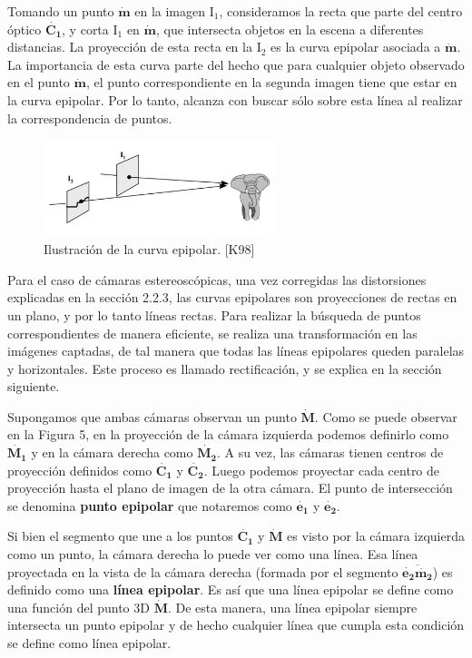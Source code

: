 \documentclass[11pt,a4paper,titlepage]{article}
\newcommand{\TwoCart}[1]{\ensuremath{\mathbf{\dot{#1}}}}
\newcommand{\ThreeCart}[1]{\ensuremath{\mathbf{\dot{#1}}}}
\newcommand{\Plane}[1]{\ensuremath{\mathrm{#1}}}
\newcommand{\Figure}[1]{Figura #1}
\newcommand{\Section}[1]{#1}
\begin{document}
Tomando un punto \TwoCart{m} en la imagen \Plane{I_1}, consideramos la recta que parte del centro óptico \ThreeCart{C_1}, y corta \Plane{I_1} en \TwoCart{m}, que intersecta objetos en la escena a diferentes distancias. La proyección de esta recta en la \Plane{I_2} es la curva epipolar asociada a \TwoCart{m}. La importancia de esta curva parte del hecho que para cualquier objeto observado en el punto \TwoCart{m}, el punto correspondiente en la segunda imagen tiene que estar en la curva epipolar. Por lo tanto, alcanza con buscar sólo sobre esta línea al realizar la correspondencia de puntos.


\begin{figure}[h!]

  \centering
    \includegraphics[width=0.6\textwidth]{f4.png}
  \caption{Ilustración de la curva epipolar. [K98]}
\end{figure}

Para el caso de cámaras estereoscópicas, una vez corregidas las distorsiones explicadas en la sección \Section{2.2.3}, las curvas epipolares son proyecciones de rectas en un plano, y por lo tanto líneas rectas. Para realizar la búsqueda de puntos correspondientes de manera eficiente, se realiza una transformación en las imágenes captadas, de tal manera que todas las líneas epipolares queden paralelas y horizontales. Este proceso es llamado rectificación, y se explica en la sección siguiente.

Supongamos que ambas cámaras observan un punto \ThreeCart{M}. Como se puede observar en la \Figure{5}, en la proyección de la cámara izquierda podemos definirlo como \ThreeCart{M_1} y en la cámara derecha como \ThreeCart{M_2}. A su vez, las cámaras tienen centros de proyección definidos como \ThreeCart{C_1}  y \ThreeCart{C_2}. Luego podemos proyectar cada centro de proyección hasta el plano de imagen de la otra cámara. El punto de intersección se denomina \textbf{punto epipolar} que notaremos como \TwoCart{e_1} y \TwoCart{e_2}.

Si bien el segmento que une a los puntos \ThreeCart{C_1} y \ThreeCart{M} es visto por la cámara izquierda como un punto, la cámara derecha lo puede ver como una línea. Esa línea proyectada en la vista de la cámara derecha (formada por el segmento $\overline{\TwoCart{e_2}\TwoCart{m_2}}$) es definido como una \textbf{línea epipolar}. Es así que una línea epipolar se define como una función del punto 3D \ThreeCart{M}. De esta manera, una línea epipolar siempre intersecta un punto epipolar y de hecho cualquier línea que cumpla esta condición se define como línea epipolar.
\end{document}
